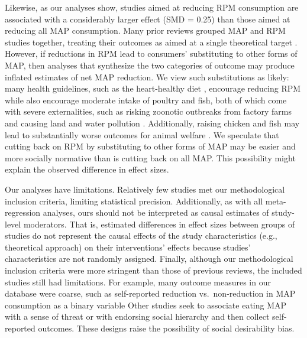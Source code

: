 \documentclass[sn-nature,referee,lineno,pdflatex]{sn-jnl}
\begin{document}
Likewise, as our analyses show, studies aimed at reducing RPM
consumption are associated with a considerably larger effect (SMD =
0.25) than those aimed at reducing all MAP consumption. Many prior
reviews grouped MAP and RPM studies together, treating their outcomes as
aimed at a single theoretical target \citep{slough2023}. However, if
reductions in RPM lead to consumers' substituting to other forms of MAP,
then analyses that synthesize the two categories of outcome may produce
inflated estimates of net MAP reduction. We view such substitutions as
likely: many health guidelines, such as the heart-healthy diet
\citep{diab2023}, encourage reducing RPM while also encourage moderate
intake of poultry and fish, both of which come with severe
externalities, such as risking zoonotic outbreaks from factory farms
\citep{hafez2020} and causing land and water pollution
\citep{grvzinic2023}. Additionally, raising chicken and fish may lead to
substantially worse outcomes for animal welfare
\citep{mathur2022ethical}. We speculate that cutting back on RPM by
substituting to other forms of MAP may be easier and more socially
normative than is cutting back on all MAP. This possibility might
explain the observed difference in effect sizes.

Our analyses have limitations. Relatively few studies met our
methodological inclusion criteria, limiting statistical precision.
Additionally, as with all meta-regression analyses, ours should not be
interpreted as causal estimates of study-level moderators. That is,
estimated differences in effect sizes between groups of studies do not
represent the causal effects of the study characteristics (e.g.,
theoretical approach) on their interventions' effects because studies'
characteristics are not randomly assigned. Finally, although our
methodological inclusion criteria were more stringent than those of
previous reviews, the included studies still had limitations. For
example, many outcome measures in our database were coarse, such as
self-reported reduction vs.~non-reduction in MAP consumption as a binary
variable \citep{aberman2018} Other studies seek to associate eating MAP
with a sense of threat \citep{fehrenbach2015} or with endorsing social
hierarchy \citep{allen2002} and then collect self-reported outcomes.
These designs raise the possibility of social desirability bias.
\end{document}
